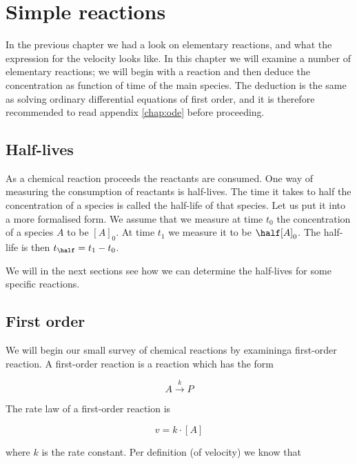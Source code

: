 
\chapter{Simple reactions}
\label{chap:simpleReactions}

In the previous chapter we had a look on elementary reactions, and
what the expression for the velocity looks like. In this chapter we
will examine a number of elementary reactions; we will begin with a
reaction and then deduce the concentration as function of time of the
main species. The deduction is the same as solving ordinary
differential equations of first order, and it is therefore recommended
to read appendix \ref{chap:ode} before proceeding.


\section{Half-lives}
\label{sec:halfLives}

As a chemical reaction proceeds the reactants are consumed. One way of
measuring the consumption of reactants is half-lives. The time it
takes to half the concentration of a species is called the half-life
of that species. Let us put it into a more formalised form. We assume
that we measure at time $t_0$ the concentration of a species $A$ to be
$[A]_0$. At time $t_1$ we measure it to be $\half[A]_0$. The half-life
is then $t_\half = t_1 - t_0$.

We will in the next sections see how we can determine the half-lives
for some specific reactions.


\section{First order}
\label{sec:firstOrder}

We will begin our small survey of chemical reactions by examininga
first-order reaction. A first-order reaction is a reaction which has
the form

\begin{equation}
  \label{eq:firstOrderReaction}
  A \overset{k}{\rightarrow} P
\end{equation}

The rate law of a first-order reaction is

\begin{equation}
  \label{eq:firstOrderVelocity1}
  v = k\cdot [A]
\end{equation}

where $k$ is the rate constant. Per definition (of velocity) we know that

